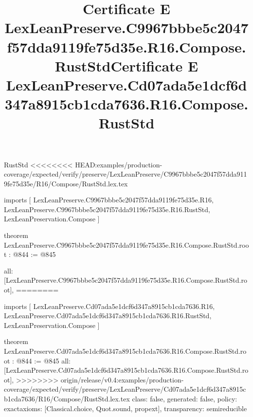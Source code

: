 \begin{lexlean}{RustStd}
<<<<<<<< HEAD:examples/production-coverage/expected/verify/preserve/LexLeanPreserve/C9967bbbe5c2047f57dda9119fe75d35e/R16/Compose/RustStd.lex.tex
\title{Certificate E LexLeanPreserve.C9967bbbe5c2047f57dda9119fe75d35e.R16.Compose.RustStd}
\begin{coremodule}
imports [
  LexLeanPreserve.C9967bbbe5c2047f57dda9119fe75d35e.R16,
  LexLeanPreserve.C9967bbbe5c2047f57dda9119fe75d35e.R16.RustStd,
  LexLeanPreservation.Compose
]

theorem LexLeanPreserve.C9967bbbe5c2047f57dda9119fe75d35e.R16.Compose.RustStd.root : @844 := @845 {
  all: [LexLeanPreserve.C9967bbbe5c2047f57dda9119fe75d35e.R16.Compose.RustStd.root],
========
\title{Certificate E LexLeanPreserve.Cd07ada5e1dcf6d347a8915cb1cda7636.R16.Compose.RustStd}
\begin{coremodule}
imports [
  LexLeanPreserve.Cd07ada5e1dcf6d347a8915cb1cda7636.R16,
  LexLeanPreserve.Cd07ada5e1dcf6d347a8915cb1cda7636.R16.RustStd,
  LexLeanPreservation.Compose
]

theorem LexLeanPreserve.Cd07ada5e1dcf6d347a8915cb1cda7636.R16.Compose.RustStd.root : @844 := @845 {
  all: [LexLeanPreserve.Cd07ada5e1dcf6d347a8915cb1cda7636.R16.Compose.RustStd.root],
>>>>>>>> origin/release/v0.4:examples/production-coverage/expected/verify/preserve/LexLeanPreserve/Cd07ada5e1dcf6d347a8915cb1cda7636/R16/Compose/RustStd.lex.tex
  class: false,
  generated: false,
  policy: exact{axioms: [Classical.choice, Quot.sound, propext]},
  transparency: semireducible
}


\end{coremodule}}
\end{coremodule}
\end{lexlean}
